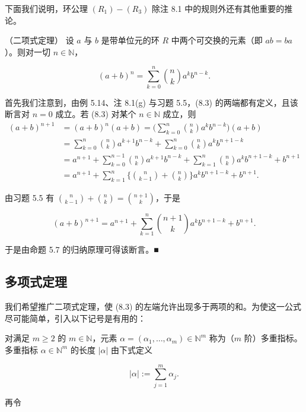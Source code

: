 下面我们说明，环公理  $ (R_1)-(R_3) $ 除注 8.1 中的规则外还有其他重要的推论。

\begin{theorem}

（二项式定理） 设 $a$ 与 $b$ 是带单位元的环 $R$ 中两个可交换的元素（即 $ab = ba$）。则对一切 $n \in \mathbb{N}$，

\begin{equation}
(a+b)^{n}=\sum_{k=0}^{n}\binom{n}{k}a^{k}b^{n-k}.
\end{equation}

\proofhead
首先我们注意到，由例 5.14、注 8.1(g) 与习题 5.5，(8.3) 的两端都有定义，且该断言对 $n = 0$ 成立。若 (8.3) 对某个 $n \in \mathbb{N}$ 成立，则
\begin{equation*}
\begin{aligned}
(a+b)^{n+1}&=(a+b)^{n}(a+b)=\biggl(\sum_{k=0}^{n}\binom{n}{k}a^{k} b^{n-k}\biggr)(a+b)\\&=\sum_{k=0}^{n}\binom{n}{k}a^{k+1}b^{n-k}+\sum_{k=0}^{n}\binom{n}{k}a^{k} b^{n+1-k}\\&=a^{n+1}+\sum_{k=0}^{n-1}\binom{n}{k}a^{k+1}b^{n-k}+\sum_{k=1}^{n}\binom{n}{k}a^{k} b^{n+1-k}+b^{n+1}\\&=a^{n+1}+\sum_{k=1}^{n}\biggl\{\binom{n}{k-1}+\binom{n}{k}\biggr\}a^{k} b^{n+1-k}+b^{n+1}.
\end{aligned}
\end{equation*}

由习题 5.5 有  $ \binom{n}{k-1}+\binom{n}{k}=\binom{n+1}{k} $，于是

\[
(a+b)^{n+1}=a^{n+1}+\sum_{k=1}^{n}\binom{n+1}{k}a^{k}b^{n+1-k}+b^{n+1}.
\]

于是由命题 5.7 的归纳原理可得该断言。■

\end{theorem}

\subsection*{多项式定理}

我们希望推广二项式定理，使 (8.3) 的左端允许出现多于两项的和。为使这一公式尽可能简单，引入以下记号是有用的：

对满足  $ m \geq 2 $ 的  $ m \in \mathbb{N} $，元素  $ \alpha = (\alpha_1, \ldots, \alpha_m) \in \mathbb{N}^m $ 称为（$ m $ 阶）多重指标。多重指标  $ \alpha \in \mathbb{N}^m $ 的长度  $ |\alpha| $ 由下式定义

\[
|\alpha|:=\sum_{j=1}^{m}\alpha_{j}.
\]

再令

